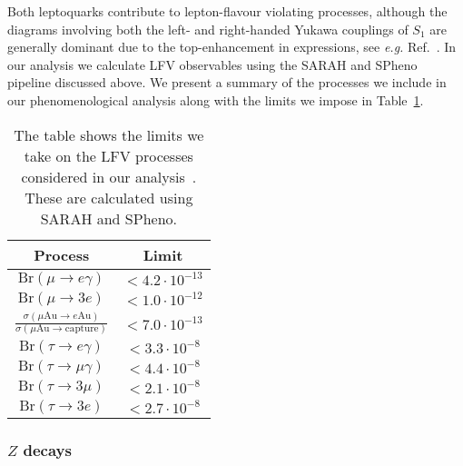 Both leptoquarks contribute to lepton-flavour violating processes, although the
diagrams involving both the left- and right-handed Yukawa couplings of $S_{1}$
are generally dominant due to the top-enhancement in expressions, see
\textit{e.g.} Ref.~\cite{Angel:2013hla}. In our analysis we calculate LFV
observables using the \textsf{SARAH} and \textsf{SPheno} pipeline discussed
above. We present a summary of the processes we include in our phenomenological
analysis along with the limits we impose in Table~\ref{tab:ch4-lfv-summary}.

\begin{table}[t]
  \centering
  \bgroup
  \def\arraystretch{1.3}
  \begin{tabular}{cc}
    \toprule
    Process & Limit \\
    \midrule
    $\text{Br}(\mu \to e \gamma)$ & $< 4.2 \cdot 10^{-13}$   \\
    $\text{Br}(\mu \to 3 e)$ &  $< 1.0 \cdot 10^{-12}$  \\
    $\frac{\sigma(\mu \text{Au}\to e\text{Au})}{\sigma(\mu \text{Au}\to \text{capture})}$ &  $< 7.0 \cdot 10^{-13}$  \\
    $\text{Br}(\tau \to e \gamma)$ & $< 3.3 \cdot 10^{-8}$   \\
    $\text{Br}(\tau \to \mu \gamma)$ &$< 4.4 \cdot 10^{-8}$    \\
    $\text{Br}(\tau \to 3\mu)$ &  $< 2.1 \cdot 10^{-8}$  \\
    $\text{Br}(\tau \to 3 e)$ &  $< 2.7 \cdot 10^{-8}$  \\
    \bottomrule
  \end{tabular}
  \egroup
  \caption[The table shows the limits we take on the LFV processes considered in
  our analysis~\cite{PhysRevD.98.030001}.]{The table shows the limits we take on
    the LFV processes considered in our analysis~\cite{PhysRevD.98.030001}.
    These are calculated using \textsf{SARAH} and \textsf{SPheno}.}
  \label{tab:ch4-lfv-summary}
\end{table}

\subsubsection{$Z$ decays}

